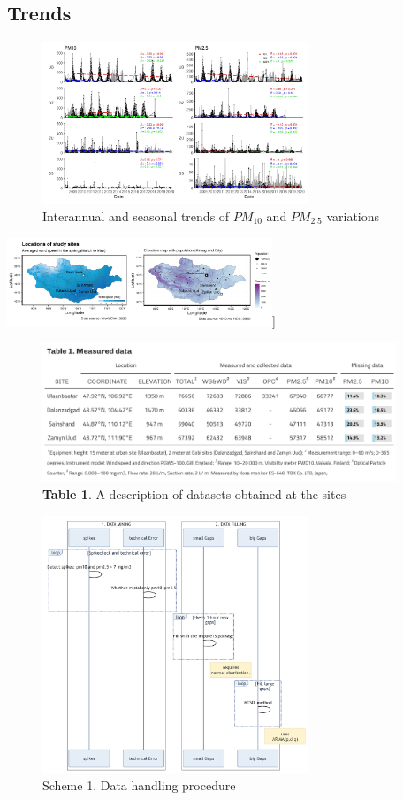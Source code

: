 \documentclass[
  11pt,
]{article}
\begin{document}
\newpage
\subsection{Trends}

\begin{figure}
\centering
\includegraphics[width=3.125in,height=\textheight,keepaspectratio]{images/figure_8.png}
\caption{Interannual and seasonal trends of \(PM_{10}\) and \(PM_{2.5}\)
variations}
\end{figure}

\newpage

\includegraphics[width=3.125in,height=\textheight,keepaspectratio]{images/figure_1.png}{]}

\begin{figure}
\centering
\includegraphics[width=4.16667in,height=\textheight,keepaspectratio]{images/table_1.png}
\caption{\textbf{Table 1}. A description of datasets obtained at the
sites}
\end{figure}

\newpage

\begin{figure}
\centering
\includegraphics[width=3.125in,height=\textheight,keepaspectratio]{images/scheme_1.png}
\caption{Scheme 1. Data handling procedure}
\end{figure}
\end{document}

